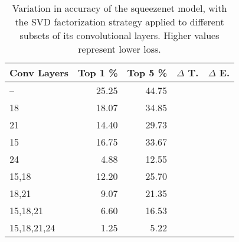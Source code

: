 \begin{table}
\centering
\begin{tabular}{|l|r|r|r|r|}
\hline
Conv Layers & Top 1 \% & Top 5 \% & $\Delta$ T. & $\Delta$ E. \\\hline
-- & 25.25 & 44.75 &  & \\\hline
18 & 18.07 & 34.85 &  &  \\\hline
21 & 14.40 & 29.73 &  &  \\\hline
15 & 16.75 & 33.67 &  &  \\\hline
24 & 4.88 & 12.55 &  &  \\\hline
15,18 & 12.20 & 25.70 &  &  \\\hline
18,21 & 9.07 & 21.35 &  &  \\\hline
15,18,21 & 6.60 & 16.53 &  &  \\\hline
15,18,21,24 & 1.25 & 5.22 &  &  \\\hline
\end{tabular}
\caption{Variation in accuracy of the squeezenet model, with the SVD factorization strategy applied to different subsets of its convolutional layers. Higher values represent lower loss.}
\label{squeezenet-accuracy}
\end{table}
